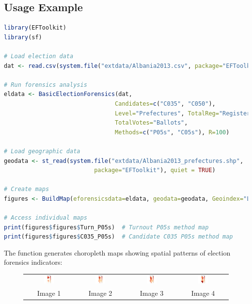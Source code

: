 \documentclass{article}
\begin{document}
\subsection{Usage Example}
\begin{lstlisting}[language=R]
library(EFToolkit)
library(sf)

# Load election data
dat <- read.csv(system.file("extdata/Albania2013.csv", package="EFToolkit"))

# Run forensics analysis
eldata <- BasicElectionForensics(dat,
                                Candidates=c("C035", "C050"),
                                Level="Prefectures", TotalReg="Registered",
                                TotalVotes="Ballots",
                                Methods=c("P05s", "C05s"), R=100)

# Load geographic data
geodata <- st_read(system.file("extdata/Albania2013_prefectures.shp",
                          package="EFToolkit"), quiet = TRUE)

# Create maps
figures <- BuildMap(eforensicsdata=eldata, geodata=geodata, Geoindex="Level")

# Access individual maps
print(figures$figures$Turn_P05s)  # Turnout P05s method map
print(figures$figures$C035_P05s)  # Candidate C035 P05s method map
\end{lstlisting}

The function generates choropleth maps showing spatial patterns of election forensics indicators:

\begin{figure}[h]
\centering
\begin{tabular}{cccc}
\includegraphics[width=0.22\textwidth]{inst/figures/img1.png} &
\includegraphics[width=0.22\textwidth]{inst/figures/img2.png} &
\includegraphics[width=0.22\textwidth]{inst/figures/img3.png} &
\includegraphics[width=0.22\textwidth]{inst/figures/img4.png} \\
Image 1 & Image 2 & Image 3 & Image 4 \\
\end{tabular}
\end{figure}
\end{document}
